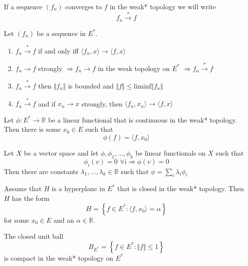 \begin{defn}
	If a sequence $(f_{n})$ converges to $f$ in the weak* topology we will write
	\[
		f_{n} \xrightarrow{*} f
	\]
	
\end{defn}


\begin{prop}
	Let $(f_{n})$ be a sequence in $E^{*}$.
	\begin{enumerate}
		\item $f_{n} \xrightarrow{*} f$ if and only iff $ \langle f_{n}, x \rangle \to \langle f,x \rangle$
		\item $ f_{n} \to f$ strongly $ \Rightarrow f_{n} \to f$ in the weak topology on $E^{*}$ $ \Rightarrow f_{n} \xrightarrow{*} f$
		\item $f_{n} \xrightarrow{*} f$ then $ \Vert f_{n} \Vert$ is bounded and $ \Vert f \Vert \leq \mathrm{liminf} \Vert f_{n} \Vert$
		\item $f_{n} \xrightarrow{*} f$ and if $x_{n} \to x$ strongly, then $ \langle f_{n},x_{n} \rangle \to \langle f,x \rangle$
	\end{enumerate}
\end{prop}

\begin{prop}
Let $ \phi: E^{*} \to \mathbb{R}$ be a linear functional that is continuous in the weak* topology. Then there is some $x_{0} \in E$ such that
\[
	\phi(f) = \langle f,x_{0} \rangle
\]

\end{prop}


\begin{lem}
Let $X$ be a vector space and let $ \phi, \phi_{1}, \ldots, \phi_{k}$ be linear functionals on $X$ such that
\[
	\phi_{i}(v) = 0 \hspace{4pt} \forall i \Rightarrow \phi(v) = 0
\]
Then there are constants $ \lambda_{1}, \ldots, \lambda_{k} \in \mathbb{R}$ such that $ \phi = \sum_{i} \lambda_{i} \phi_{i}$
\end{lem}

\begin{cor}
Assume that $H$ is a hyperplane in $E^{*}$ that is closed in the weak* topology. Then $ H $ has the form
\[
H = \left\{ f \in E^{*}: \langle f,x_{0} \rangle = \alpha \right\}
\]
for some $x_{0} \in E$ and an $ \alpha \in \mathbb{R}$.
\end{cor}

\begin{thm}
The closed unit ball
\[
B_{E^{*}} = \left\{ f \in E^{*}: \Vert f \Vert \leq 1 \right\}
\]
is compact in the weak* topology on $ E^{*} $
\end{thm}

